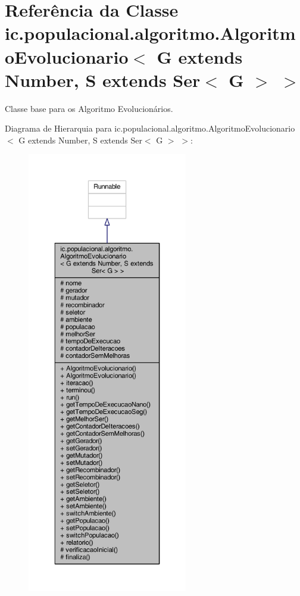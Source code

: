 \hypertarget{classic_1_1populacional_1_1algoritmo_1_1_algoritmo_evolucionario_3_01_g_01extends_01_number_00_0bd52af860edf752f8985460efb0aa102}{\section{Referência da Classe ic.\-populacional.\-algoritmo.\-Algoritmo\-Evolucionario$<$ G extends Number, S extends Ser$<$ G $>$ $>$}
\label{classic_1_1populacional_1_1algoritmo_1_1_algoritmo_evolucionario_3_01_g_01extends_01_number_00_0bd52af860edf752f8985460efb0aa102}
}


Classe base para os Algoritmo Evolucionários.  




Diagrama de Hierarquia para ic.\-populacional.\-algoritmo.\-Algoritmo\-Evolucionario$<$ G extends Number, S extends Ser$<$ G $>$ $>$\-:\nopagebreak
\begin{figure}[H]
\begin{center}
\leavevmode
\includegraphics[height=550pt]{classic_1_1populacional_1_1algoritmo_1_1_algoritmo_evolucionario_3_01_g_01extends_01_number_00_084e8a833e06363c6e07e8c904cf451a1}
\end{center}
\end{figure}


